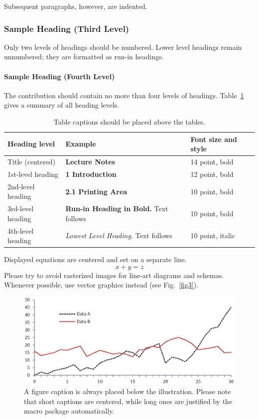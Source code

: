\documentclass[runningheads]{llncs}
\begin{document}
Subsequent paragraphs, however, are indented.

\subsubsection{Sample Heading (Third Level)} Only two levels of
headings should be numbered. Lower level headings remain unnumbered;
they are formatted as run-in headings.

\paragraph{Sample Heading (Fourth Level)}
The contribution should contain no more than four levels of
headings. Table~\ref{tab1} gives a summary of all heading levels.

\begin{table}
\caption{Table captions should be placed above the
tables.}\label{tab1}
\begin{tabular}{|l|l|l|}
\hline
Heading level &  Example & Font size and style\\
\hline
Title (centered) &  {\Large\bfseries Lecture Notes} & 14 point, bold\\
1st-level heading &  {\large\bfseries 1 Introduction} & 12 point, bold\\
2nd-level heading & {\bfseries 2.1 Printing Area} & 10 point, bold\\
3rd-level heading & {\bfseries Run-in Heading in Bold.} Text follows & 10 point, bold\\
4th-level heading & {\itshape Lowest Level Heading.} Text follows & 10 point, italic\\
\hline
\end{tabular}
\end{table}


\noindent Displayed equations are centered and set on a separate
line.
\begin{equation}
x + y = z
\end{equation}
Please try to avoid rasterized images for line-art diagrams and
schemas. Whenever possible, use vector graphics instead (see
Fig.~\ref{fig3}).

\begin{figure}
\includegraphics[width=\textwidth]{fig1.eps}
\caption{A figure caption is always placed below the illustration.
Please note that short captions are centered, while long ones are
justified by the macro package automatically.} \label{fig1}
\end{figure}
\end{document}
